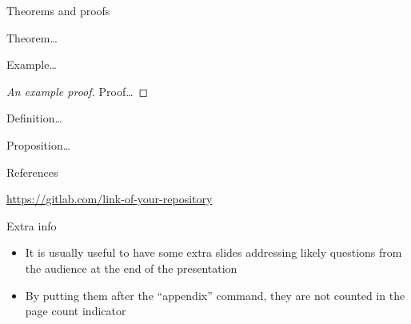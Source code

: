 \documentclass[xcolor={usenames,svgnames,dvipsnames},brazil,english,12pt,aspectratio=149]{beamer}
\begin{document}
\begin{frame}{Theorems and proofs}
  \pause
  \begin{theorem}
    Theorem\dots
  \end{theorem}

  \pause
  \begin{example}
    Example\dots
  \end{example}

  \pause
  \begin{proof}[An example proof]
    Proof\dots
  \end{proof}

  \pause
  \begin{definition}
    Definition\dots
  \end{definition}

  \pause
  \begin{proposition}
    Proposition\dots
  \end{proposition}
\end{frame}

\begin{frame}[allowframebreaks]{References}
  \printbibliography
\end{frame}

\begin{frame}{\insertshorttitle}
  \overview

  {
    \centering\noindent%
    \url{https://gitlab.com/link-of-your-repository}\par
  }

\end{frame}

\showqrcode

\appendix

\begin{frame}{Extra info}
  \begin{itemize}
    \item It is usually useful to have some extra slides addressing likely questions from the audience at the end of the presentation
    \item By putting them after the ``appendix'' command, they are not counted in the page count indicator
  \end{itemize}
\end{frame}
\end{document}
